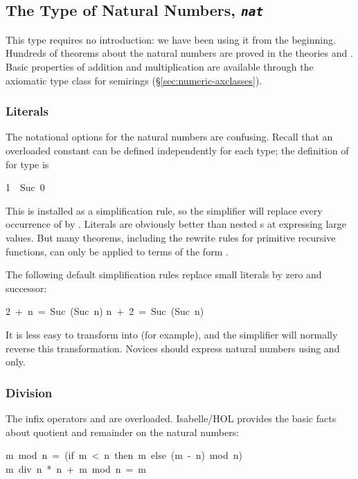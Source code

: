 \subsection{The Type of Natural Numbers, {\tt\slshape nat}}

%
This type requires no introduction: we have been using it from the
beginning.  Hundreds of theorems about the natural numbers are
proved in the theories  and .  
Basic properties of addition and multiplication are available through the
axiomatic type class for semirings (\S\ref{sec:numeric-axclasses}).

\subsubsection{Literals}
%
The notational options for the natural  numbers are confusing.  Recall that an
overloaded constant can be defined independently for each type; the definition
of  for type  is
\begin{isabelle}
1\ \isasymequiv\ Suc\ 0
\end{isabelle}
This is installed as a simplification rule, so the simplifier will replace
every occurrence of  by .  Literals are obviously
better than nested s at expressing large values.  But many theorems,
including the rewrite rules for primitive recursive functions, can only be
applied to terms of the form .

The following default  simplification rules replace
small literals by zero and successor: 
\begin{isabelle}
2\ +\ n\ =\ Suc\ (Suc\ n)
\isanewline
n\ +\ 2\ =\ Suc\ (Suc\ n)
\end{isabelle}
It is less easy to transform  into  (for example), and
the simplifier will normally reverse this transformation.  Novices should
express natural numbers using  and  only.

\subsubsection{Division}
%
The infix operators  and  are overloaded.
Isabelle/HOL provides the basic facts about quotient and remainder
on the natural numbers:
\begin{isabelle}
m\ mod\ n\ =\ (if\ m\ <\ n\ then\ m\ else\ (m\ -\ n)\ mod\ n)
\isanewline
m\ div\ n\ *\ n\ +\ m\ mod\ n\ =\ m%
\end{isabelle}


